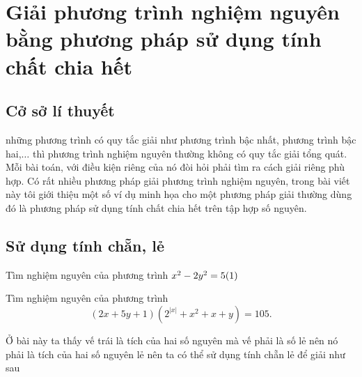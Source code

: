 \section{Giải phương trình nghiệm nguyên bằng phương pháp sử dụng tính chất chia hết}
\begin{center}
	\textbf{\color{violet}{Nguyễn Thị Nhung\\
			(GV Toán THCS Lê Văn Thiêm, TP Hà Tĩnh)}}
\end{center}

\subsection{Cở sở lí thuyết}
 những phương trình có quy tắc giải như phương trình bậc nhất, phương trình bậc hai,$\ldots$ thì phương trình nghiệm nguyên thường không có quy tắc giải tổng quát. Mỗi bài toán, với điều kiện riêng của nó đòi hỏi phải tìm ra cách giải riêng phù hợp. Có rất nhiều phương pháp giải phương trình nghiệm nguyên, trong bài viết này tôi giới thiệu một số ví dụ minh họa cho một phương pháp giải thường dùng đó là phương pháp sử dụng tính chất chia hết trên tập hợp số nguyên.
\subsection{Sử dụng tính chẵn, lẻ}


\begin{vd}%
	Tìm nghiệm nguyên của phương trình $x^2-2y^2=5 \hfill (1)$
\end{vd}


\begin{vd}%
	Tìm nghiệm nguyên của phương trình 
	\[(2x+5y+1)(2^{|x|}+x^2+x+y)=105.\tag{2}\]
	\begin{nx}
		Ở bài này ta thấy vế trái là tích của hai số nguyên mà vế phải là số lẻ nên nó phải là tích của hai số nguyên lẻ nên ta có thể sử dụng tính chẵn lẻ để giải như sau
	\end{nx}
\end{vd}


